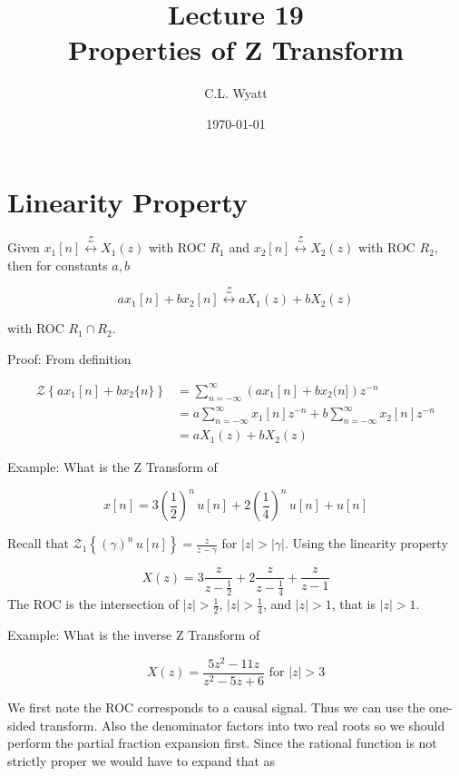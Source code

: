 \documentclass{article}
\begin{document}
\title{Lecture 19\\Properties of Z Transform}
\author{C.L. Wyatt}
\date{\today}
\maketitle

\section{Linearity Property}

Given $x_{1}[n] \stackrel{\mathcal{Z}}{\longleftrightarrow} X_{1}(z)$ with ROC $R_{1}$ and $x_{2}[n] \stackrel{\mathcal{Z}}{\longleftrightarrow} X_{2}(z)$ with ROC $R_{2}$, then for constants $a, b$

$$
a x_{1}[n]+b x_{2}[n] \stackrel{\mathcal{Z}}{\longleftrightarrow} a X_{1}(z)  +b X_{2}(z)
$$

with ROC $R_1 \cap R_2$.

Proof: From definition

$$
\begin{aligned}
  \mathcal{Z}\left\{a x_{1}[n]+b x_{2}\{n\}\right\} &= \sum_{n=-\infty}^{\infty}\left(a x_{1}[n]+b x_{2}(n]\right) z^{-n}\\
    &= a \sum_{n=-\infty}^{\infty} x_{1}[n] z^{-n}+b \sum_{n=-\infty}^{\infty} x_{2}[n] z^{-n} \\
& =a X_{1}(z)+b X_{2}(z)
\end{aligned}
$$

Example: What is the Z Transform of

$$
x[n] = 3\left(\frac{1}{2} \right)^n\, u[n] + 2\left(\frac{1}{4} \right)^n\, u[n] + u[n] 
$$

Recall that $\mathcal{Z}_1\left\{(\gamma)^n\, u[n]\right\} = \frac{z}{z-\gamma}$ for $|z| > |\gamma|$. Using the linearity property

$$
X(z) = 3 \frac{z}{z-\frac{1}{2}} + 2 \frac{z}{z-\frac{1}{4}} + \frac{z}{z-1}
$$
The ROC is the intersection of $|z| > \frac{1}{2}$, $|z| > \frac{1}{4}$, and $|z| > 1$, that is $|z| > 1$.


Example: What is the inverse Z Transform of

$$
X(z) = \frac{5z^2 - 11z}{z^2 - 5z + 6} \text{ for } |z| > 3
$$

We first note the ROC corresponds to a causal signal. Thus we can use the one-sided transform. Also the denominator factors into two real roots so we should perform the partial fraction expansion first. Since the rational function is not strictly proper we would have to expand that as
\end{document}
